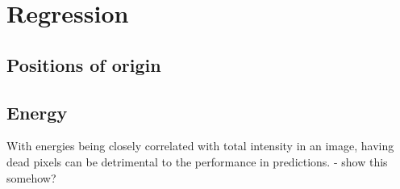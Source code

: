 \section{Regression}
\subsection{Positions of origin}

\subsection{Energy}
With energies being closely correlated with total intensity in an image,
having dead pixels can be detrimental to the performance in predictions.
- show this somehow?